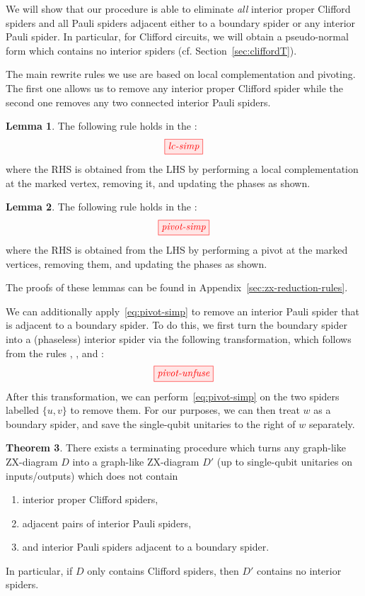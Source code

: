 \documentclass[a4paper,onecolumn,superscriptaddress,11pt,accepted=2020-04-27]{quantumarticle}
\theoremstyle{definition}
\newtheorem{theorem}{Theorem}[section]
\newtheorem{lemma}[theorem]{Lemma}
\begin{document}
We will show that our procedure is able to eliminate \emph{all} interior proper Clifford spiders and all Pauli spiders adjacent either to a boundary spider or any interior Pauli spider. In particular, for Clifford circuits, we will obtain a pseudo-normal form which contains no interior spiders (cf. Section~\ref{sec:cliffordT}).

The main rewrite rules we use are based on local complementation and pivoting. The first one allows us to remove any interior proper Clifford spider while the second one removes any two connected interior Pauli spiders.
\begin{lemma}\label{lem:lc-simp}
The following rule holds in the \zxcalculus:
\begin{equation}\label{eq:lc-simp}
  \hfill \tikzfig{lc-simp} \hfill
\end{equation}
where the RHS is obtained from the LHS by performing a local complementation at the marked vertex, removing it, and updating the phases as shown.
\end{lemma}
\begin{lemma}\label{lem:pivot-simp}
The following rule holds in the \zxcalculus:
\begin{equation}\label{eq:pivot-simp}
  \hfill \tikzfig{pivot-simp} \hfill
\end{equation}
where the RHS is obtained from the LHS by performing a pivot at the marked vertices, removing them, and updating the phases as shown.
\end{lemma}
The proofs of these lemmas can be found in Appendix~\ref{sec:zx-reduction-rules}.

We can additionally apply~\eqref{eq:pivot-simp} to remove an interior Pauli spider that is adjacent to a boundary spider. To do this, we first turn the boundary spider into a (phaseless) interior spider via the following transformation, which follows from the rules \SpiderRule, \IdentityRule, and \HHRule:
\begin{equation}\label{eq:pivot-unfuse}
  \tikzfig{pivot-unfuse}
\end{equation}
After this transformation, we can perform~\eqref{eq:pivot-simp} on the two spiders labelled $\{u, v\}$ to remove them. For our purposes, we can then treat $w$ as a boundary spider, and save the single-qubit unitaries to the right of $w$ separately.

\begin{theorem}\label{thm:simp}
There exists a terminating procedure which turns any graph-like ZX-diagram $D$ into a graph-like ZX-diagram $D'$ (up to single-qubit unitaries on inputs/outputs) which does not contain
\begin{enumerate}
\item interior proper Clifford spiders,
\item adjacent pairs of interior Pauli spiders,
\item and interior Pauli spiders adjacent to a boundary spider.
\end{enumerate}
In particular, if $D$ only contains Clifford spiders, then $D'$ contains no interior spiders.
\end{theorem}
\end{document}

